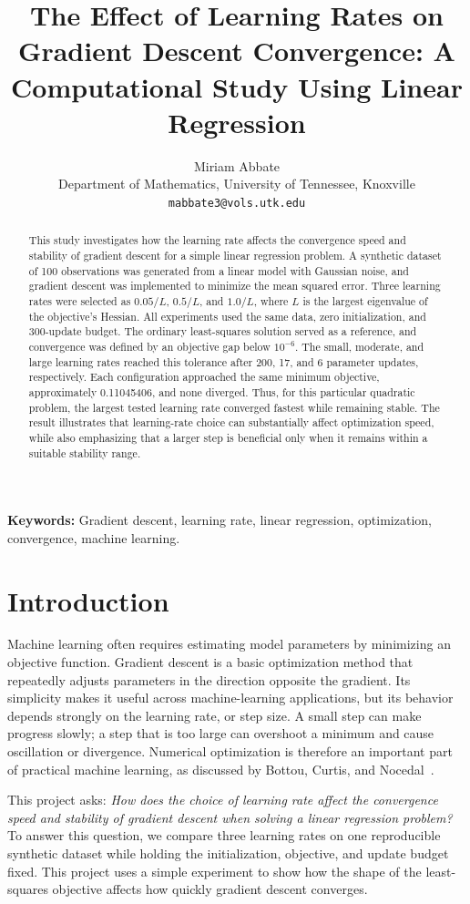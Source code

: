 \documentclass[11pt,onecolumn]{article}
\title{\textbf{The Effect of Learning Rates on Gradient Descent Convergence: A Computational Study Using Linear Regression}}
\author{Miriam Abbate\\
Department of Mathematics, University of Tennessee, Knoxville\\
\texttt{mabbate3@vols.utk.edu}}
\date{}
\begin{document}
\maketitle

\begin{abstract}
This study investigates how the learning rate affects the convergence speed and stability of gradient descent for a simple linear regression problem. A synthetic dataset of 100 observations was generated from a linear model with Gaussian noise, and gradient descent was implemented to minimize the mean squared error. Three learning rates were selected as $0.05/L$, $0.5/L$, and $1.0/L$, where $L$ is the largest eigenvalue of the objective's Hessian. All experiments used the same data, zero initialization, and 300-update budget. The ordinary least-squares solution served as a reference, and convergence was defined by an objective gap below $10^{-6}$. The small, moderate, and large learning rates reached this tolerance after 200, 17, and 6 parameter updates, respectively. Each configuration approached the same minimum objective, approximately 0.11045406, and none diverged. Thus, for this particular quadratic problem, the largest tested learning rate converged fastest while remaining stable. The result illustrates that learning-rate choice can substantially affect optimization speed, while also emphasizing that a larger step is beneficial only when it remains within a suitable stability range.
\end{abstract}

\noindent\textbf{Keywords:} Gradient descent, learning rate, linear regression, optimization, convergence, machine learning.

\section{Introduction}
Machine learning often requires estimating model parameters by minimizing an objective function. Gradient descent is a basic optimization method that repeatedly adjusts parameters in the direction opposite the gradient. Its simplicity makes it useful across machine-learning applications, but its behavior depends strongly on the learning rate, or step size. A small step can make progress slowly; a step that is too large can overshoot a minimum and cause oscillation or divergence. Numerical optimization is therefore an important part of practical machine learning, as discussed by Bottou, Curtis, and Nocedal~\cite{bottou2018}.

This project asks: \emph{How does the choice of learning rate affect the convergence speed and stability of gradient descent when solving a linear regression problem?} To answer this question, we compare three learning rates on one reproducible synthetic dataset while holding the initialization, objective, and update budget fixed. This project uses a simple experiment to show how the shape of the least-squares objective affects how quickly gradient descent converges.
\end{document}
